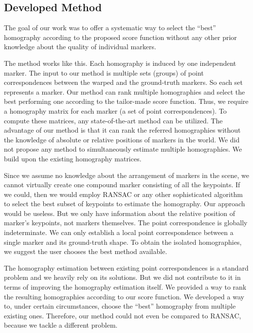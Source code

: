 \subsection{Developed Method}

The goal of our work was to offer a systematic way to select the ``best'' homography according to the proposed score function without any other prior knowledge about the quality of individual markers.

The method works like this. Each homography is induced by one independent marker. The input to our method is multiple sets (groups) of point correspondences between the warped and the ground-truth markers. So each set represents a marker. Our method can rank multiple homographies and select the best performing one according to the tailor-made score function. Thus, we require a homography matrix for each marker (a set of point correspondences). To compute these matrices, any state-of-the-art method can be utilized. The advantage of our method is that it can rank the referred homographies without the knowledge of absolute or relative positions of markers in the world. We did not propose any method to simultaneously estimate multiple homographies. We build upon the existing homography matrices.

Since we assume no knowledge about the arrangement of markers in the scene, we cannot virtually create one compound marker consisting of all the keypoints. If we could, then we would employ RANSAC or any other sophisticated algorithm to select the best subset of keypoints to estimate the homography. Our approach would be useless. But we only have information about the relative position of marker’s keypoints, not markers themselves. The point correspondence is globally indeterminate. We can only establish a local point correspondence between a single marker and its ground-truth shape. To obtain the isolated homographies, we suggest the user chooses the best method available. 

The homography estimation between existing point correspondences is a standard problem and we heavily rely on its solutions. But we did not contribute to it in terms of improving the homography estimation itself. We provided a way to rank the resulting homographies according to our score function. We developed a way to,
under certain circumstances, choose the ``best'' homography from multiple existing ones. Therefore, our method could not even be compared to RANSAC, because we tackle a different problem.

